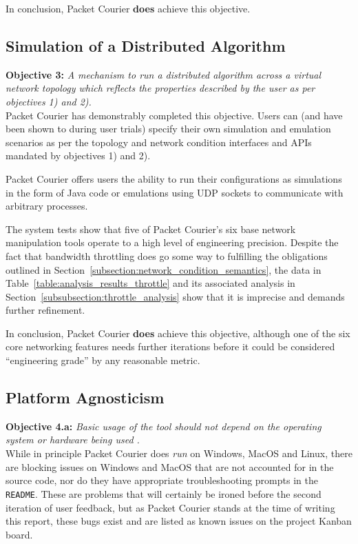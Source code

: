In conclusion, Packet Courier \textbf{does} achieve this objective.

\subsection{Simulation of a Distributed Algorithm}\label{subsection:simulation_of_a_distributed_algorithm}

\textbf{Objective 3:} \emph{A mechanism to run a distributed algorithm across a virtual network topology which
reflects the properties described by the user as per objectives 1) and 2).} \\

Packet Courier has demonstrably completed this objective. Users can (and have been shown to during user trials)
specify their own simulation and emulation scenarios as per the topology and network condition interfaces and APIs
mandated by objectives 1) and 2).

Packet Courier offers users the ability to run their configurations as simulations in the form of Java code or
emulations using UDP sockets to communicate with arbitrary processes.

The system tests show that five of Packet Courier's six base network manipulation tools operate to a high level of
engineering precision. Despite the fact that bandwidth throttling does go some way to fulfilling the obligations
outlined in Section~\ref{subsection:network_condition_semantics}, the data in
Table~\ref{table:analysis_results_throttle} and its associated analysis in
Section~\ref{subsubsection:throttle_analysis} show that it is imprecise and demands further refinement.

In conclusion, Packet Courier \textbf{does} achieve this objective, although one of the six core networking features
needs further iterations before it could be considered ``engineering grade'' by any reasonable metric.

\subsection{Platform Agnosticism}\label{subsection:platform_agnosticism}

\textbf{Objective 4.a:} \emph{Basic usage of the tool should not depend on the operating system or hardware being
used .} \\

While in principle Packet Courier does \emph{run} on Windows, MacOS and Linux, there are blocking issues on Windows
and MacOS that are not accounted for in the source code, nor do they have appropriate troubleshooting prompts in the
\texttt{README}. These are problems that will certainly be ironed before the second iteration of user feedback, but
as Packet Courier stands at the time of writing this report, these bugs exist and are listed as known issues on the
project Kanban board.

